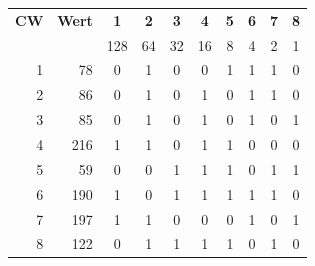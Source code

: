\begin{center}
\footnotesize
\setlength{\tabcolsep}{4pt}
\renewcommand{\arraystretch}{1.2}
\begin{tabular}{r|r|cccccccc}
\toprule
\textbf{CW} & \textbf{Wert} & \textbf{1} & \textbf{2} & \textbf{3} & \textbf{4} & \textbf{5} & \textbf{6} & \textbf{7} & \textbf{8} \\
& & \tiny 128 & \tiny 64 & \tiny 32 & \tiny 16 & \tiny 8 & \tiny 4 & \tiny 2 & \tiny 1 \\
\midrule
1 & 78 & 0 & 1 & 0 & 0 & 1 & 1 & 1 & 0 \\
2 & 86 & 0 & 1 & 0 & 1 & 0 & 1 & 1 & 0 \\
3 & 85 & 0 & 1 & 0 & 1 & 0 & 1 & 0 & 1 \\
4 & 216 & 1 & 1 & 0 & 1 & 1 & 0 & 0 & 0 \\
5 & 59 & 0 & 0 & 1 & 1 & 1 & 0 & 1 & 1 \\
6 & 190 & 1 & 0 & 1 & 1 & 1 & 1 & 1 & 0 \\
7 & 197 & 1 & 1 & 0 & 0 & 0 & 1 & 0 & 1 \\
8 & 122 & 0 & 1 & 1 & 1 & 1 & 0 & 1 & 0 \\
\bottomrule
\end{tabular}
\end{center}
